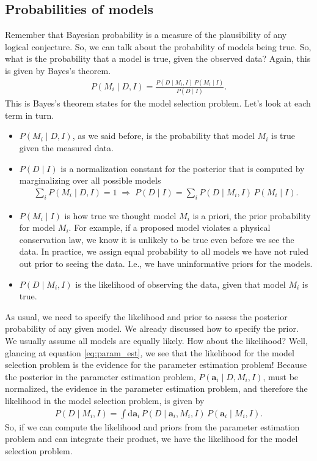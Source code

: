 \subsection{Probabilities of models}
Remember that Bayesian probability is a measure of the plausibility of
any logical conjecture.  So, we can talk about the probability of
models being true.  So, what is the probability that a model is true,
given the observed data?  Again, this is given by Bayes's theorem.
\begin{align}
P(M_i\mid D, I) = \frac{P(D\mid M_i, I)\,P(M_i\mid I)}{P(D\mid I)}.
\end{align}
This is Bayes's theorem states for the model selection problem.  Let's
look at each term in turn.
\begin{itemize}
\item $P(M_i\mid D, I)$, as we said before, is the probability that
  model $M_i$ is true given the measured data.
\item $P(D\mid I)$ is a normalization constant for the posterior that
  is computed by marginalizing over all possible models
  \begin{align}
    \sum_i P(M_i\mid D, I) = 1\;\Rightarrow\;
    P(D\mid I) = \sum_i P(D\mid M_i, I)\,P(M_i\mid I).
  \end{align}
\item $P(M_i \mid I)$ is how true we thought model $M_i$ is a priori,
  the prior probability for model $M_i$.  For example, if a proposed
  model violates a physical conservation law, we know it is unlikely
  to be true even before we see the data.  In practice, we assign
  equal probability to all models we have not ruled out prior to seeing
  the data.  I.e., we have uninformative priors for the models.
\item $P(D\mid M_i, I)$ is the likelihood of observing the data, given
  that model $M_i$ is true.
\end{itemize}

As usual, we need to specify the likelihood and prior to assess the
posterior probability of any given model.  We already discussed how to
specify the prior.  We usually assume all models are equally likely.
How about the likelihood?  Well, glancing at equation
\eqref{eq:param_est}, we see that the likelihood for the model
selection problem is the evidence for the parameter estimation
problem!  Because the posterior in the parameter estimation problem,
$P(\mathbf{a}_i\mid D, M_i, I)$, must be normalized, the evidence in
the parameter estimation problem, and therefore the likelihood in the
model selection problem, is given by
\begin{align}
P(D\mid M_i, I) = \int \mathrm{d}\mathbf{a}_i\,P(D\mid \mathbf{a}_i, M_i, I)\,
P(\mathbf{a}_i\mid M_i, I).
\label{eq:bayes_factor_integral}
\end{align}
So, if we can compute the likelihood and priors from the parameter
estimation problem and can integrate their product, we have the
likelihood for the model selection problem.


